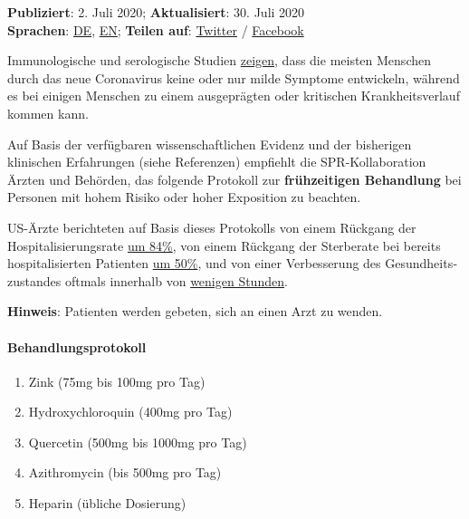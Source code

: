 \textbf{Publiziert}: 2. Juli 2020; \textbf{Aktualisiert}: 30. Juli
2020\\
\textbf{Sprachen}:
\href{https://swprs.org/zur-behandlung-von-covid-19/}{DE},
\href{https://swprs.org/on-the-treatment-of-covid-19/}{EN};
\textbf{Teilen auf}:
\href{https://twitter.com/intent/tweet?url=https://swprs.org/zur-behandlung-von-covid-19/}{Twitter}
/
\href{https://www.facebook.com/share.php?u=https://swprs.org/zur-behandlung-von-covid-19/}{Facebook}

Immunologische und serologische Studien
\href{https://swprs.org/studies-on-covid-19-lethality/}{zeigen}, dass
die meisten Menschen durch das neue Coronavirus keine oder nur milde
Symptome entwickeln, während es bei einigen Menschen zu einem
ausgeprägten oder kritischen Krankheitsverlauf kommen kann.

Auf Basis der verfügbaren wissenschaftlichen Evidenz und der bisherigen
klinischen Erfahrungen (siehe Referenzen) empfiehlt die
SPR-Kollaboration Ärzten und Behörden, das folgende Protokoll zur
\textbf{frühzeitigen Behandlung} bei Personen mit hohem Risiko oder
hoher Exposition zu beachten.

US-Ärzte berichteten auf Basis dieses Protokolls von einem Rückgang der
Hospitali­sierungs­rate
\href{https://www.preprints.org/manuscript/202007.0025/v1}{um 84\%}, von
einem Rückgang der Sterberate bei bereits hospitalisierten Patienten
\href{https://www.henryford.com/news/2020/07/hydro-treatment-study}{um
50\%}, und von einer Verbesserung des Gesund­heits­zustandes oftmals
innerhalb von \href{https://www.youtube.com/watch?v=eVs_EWVCVPc}{wenigen
Stunden}.

\textbf{Hinweis}: Patienten werden gebeten, sich an einen Arzt zu
wenden.

\hypertarget{behandlungsprotokoll}{%
\paragraph{Behandlungsprotokoll}\label{behandlungsprotokoll}}

\begin{enumerate}
\def\labelenumi{\arabic{enumi}.}
\tightlist
\item
  Zink (75mg bis 100mg pro Tag)
\item
  Hydroxychloroquin (400mg pro Tag)
\item
  Quercetin (500mg bis 1000mg pro Tag)
\item
  Azithromycin (bis 500mg pro Tag)
\item
  Heparin (übliche Dosierung)
\end{enumerate}

